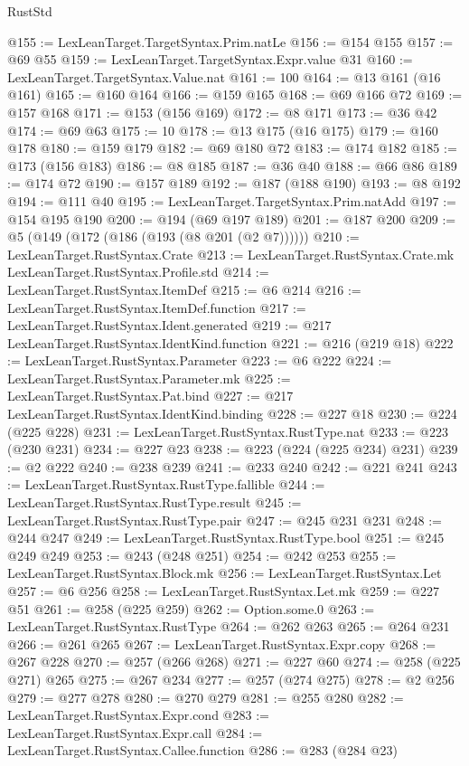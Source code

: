 \begin{lexlean}{RustStd}
\begin{coremodule}
@155 := LexLeanTarget.TargetSyntax.Prim.natLe
@156 := @154 @155
@157 := @69 @55
@159 := LexLeanTarget.TargetSyntax.Expr.value @31
@160 := LexLeanTarget.TargetSyntax.Value.nat
@161 := 100
@164 := @13 @161 (@16 @161)
@165 := @160 @164
@166 := @159 @165
@168 := @69 @166 @72
@169 := @157 @168
@171 := @153 (@156 @169)
@172 := @8 @171
@173 := @36 @42
@174 := @69 @63
@175 := 10
@178 := @13 @175 (@16 @175)
@179 := @160 @178
@180 := @159 @179
@182 := @69 @180 @72
@183 := @174 @182
@185 := @173 (@156 @183)
@186 := @8 @185
@187 := @36 @40
@188 := @66 @86
@189 := @174 @72
@190 := @157 @189
@192 := @187 (@188 @190)
@193 := @8 @192
@194 := @111 @40
@195 := LexLeanTarget.TargetSyntax.Prim.natAdd
@197 := @154 @195 @190
@200 := @194 (@69 @197 @189)
@201 := @187 @200
@209 := @5 (@149 (@172 (@186 (@193 (@8 @201 (@2 @7))))))
@210 := LexLeanTarget.RustSyntax.Crate
@213 := LexLeanTarget.RustSyntax.Crate.mk LexLeanTarget.RustSyntax.Profile.std
@214 := LexLeanTarget.RustSyntax.ItemDef
@215 := @6 @214
@216 := LexLeanTarget.RustSyntax.ItemDef.function
@217 := LexLeanTarget.RustSyntax.Ident.generated
@219 := @217 LexLeanTarget.RustSyntax.IdentKind.function
@221 := @216 (@219 @18)
@222 := LexLeanTarget.RustSyntax.Parameter
@223 := @6 @222
@224 := LexLeanTarget.RustSyntax.Parameter.mk
@225 := LexLeanTarget.RustSyntax.Pat.bind
@227 := @217 LexLeanTarget.RustSyntax.IdentKind.binding
@228 := @227 @18
@230 := @224 (@225 @228)
@231 := LexLeanTarget.RustSyntax.RustType.nat
@233 := @223 (@230 @231)
@234 := @227 @23
@238 := @223 (@224 (@225 @234) @231)
@239 := @2 @222
@240 := @238 @239
@241 := @233 @240
@242 := @221 @241
@243 := LexLeanTarget.RustSyntax.RustType.fallible
@244 := LexLeanTarget.RustSyntax.RustType.result
@245 := LexLeanTarget.RustSyntax.RustType.pair
@247 := @245 @231 @231
@248 := @244 @247
@249 := LexLeanTarget.RustSyntax.RustType.bool
@251 := @245 @249 @249
@253 := @243 (@248 @251)
@254 := @242 @253
@255 := LexLeanTarget.RustSyntax.Block.mk
@256 := LexLeanTarget.RustSyntax.Let
@257 := @6 @256
@258 := LexLeanTarget.RustSyntax.Let.mk
@259 := @227 @51
@261 := @258 (@225 @259)
@262 := Option.some.{0}
@263 := LexLeanTarget.RustSyntax.RustType
@264 := @262 @263
@265 := @264 @231
@266 := @261 @265
@267 := LexLeanTarget.RustSyntax.Expr.copy
@268 := @267 @228
@270 := @257 (@266 @268)
@271 := @227 @60
@274 := @258 (@225 @271) @265
@275 := @267 @234
@277 := @257 (@274 @275)
@278 := @2 @256
@279 := @277 @278
@280 := @270 @279
@281 := @255 @280
@282 := LexLeanTarget.RustSyntax.Expr.cond
@283 := LexLeanTarget.RustSyntax.Expr.call
@284 := LexLeanTarget.RustSyntax.Callee.function
@286 := @283 (@284 @23)

\end{coremodule}
\end{lexlean}
